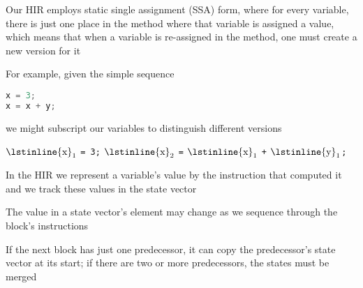 \documentclass[8pt,a4paper,compress]{beamer}
\newcommand{\subs}[2]{${#1}_{#2}$}
\begin{document}
\begin{frame}[fragile]
\pause

Our HIR employs static single assignment (SSA) form, where for every variable, there is just one place in the method where that variable is assigned a value, which means that when a variable is re-assigned in the method, one must create a new version for it

\pause
\bigskip

For example, given the simple sequence
\begin{lstlisting}[language=Java]
x = 3;
x = x + y;
\end{lstlisting}
we might subscript our variables to distinguish different versions
\begin{production}
\subs{\text{\lstinline{x}}}{\text{1}} \lstinline{= 3;}
\subs{\text{\lstinline{x}}}{\text{2}} \lstinline{=} \subs{\text{\lstinline{x}}}{\text{1}} \lstinline{+} \subs{\text{\lstinline{y}}}{\text{1}}\lstinline{;}
\end{production}

\pause
\bigskip

In the HIR we represent a variable's value by the instruction that computed it and we track these values in the state vector

\pause
\bigskip

The value in a state vector's element may change as we sequence through the block's instructions

\pause
\bigskip

If the next block has just one predecessor, it can copy the predecessor's state vector at its start; if there are two or more predecessors, the states must be merged
\end{frame}
\end{document}
